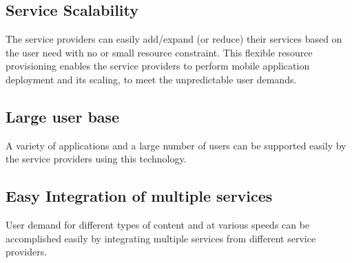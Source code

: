 \documentclass[10pt, conference, compsocconf]{IEEEtran}
\begin{document}
\subsection{Service Scalability}
The service providers can easily add/expand (or reduce) their services based on the user need with no or small resource constraint. This flexible resource provisioning enables the service providers to perform mobile application deployment and its scaling, to meet the unpredictable user demands.

\subsection{Large user base}
A variety of applications and a large number of users can be supported easily by the service providers using this technology.

\subsection{Easy Integration of multiple services}
User demand for different types of content and at various speeds can be accomplished easily by integrating multiple services from different service providers.


%
%

\end{document}
